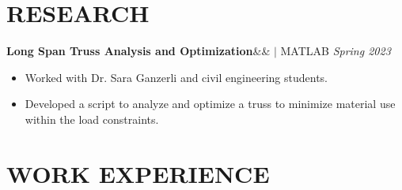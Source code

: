 \documentclass[11pt, a4paper, roman]{moderncv}
\newcommand{\project}[5]{
	\textbf{#1}\ifx&#2&{}
	\else
    		\href{#2}{\:\small\faGithub\:}\fi$|$ #3
	\hfill\textit{#4}
	#5
	\vspace{2mm}
}
\begin{document}




\vspace*{-2mm}
\section{RESEARCH}
{\project{Long Span Truss Analysis and Optimization}{}{MATLAB}{Spring 2023}
	{\begin{itemize}
		\item Worked with Dr. Sara Ganzerli and civil engineering students.
		\item Developed a script to analyze and optimize a truss to minimize material use within the load constraints.
	\end{itemize}}
}

\vspace*{-2mm}
\section{WORK EXPERIENCE}
\end{document}
